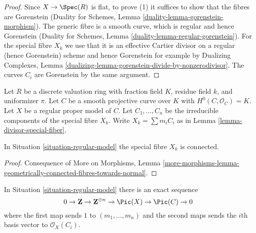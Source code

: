 \begin{proof}
Since $X \to \Spec(R)$ is flat, to prove (1)
it suffices to show that the fibres are Gorenstein
(Duality for Schemes, Lemma \ref{duality-lemma-gorenstein-morphism}).
The generic fibre is a smooth curve, which is regular and hence Gorenstein
(Duality for Schemes, Lemma \ref{duality-lemma-regular-gorenstein}).
For the special fibre $X_k$ we use that it is an effective
Cartier divisor on a regular (hence Gorenstein) scheme and hence
Gorenstein for example by Dualizing Complexes, Lemma
\ref{dualizing-lemma-gorenstein-divide-by-nonzerodivisor}.
The curves $C_i$ are Gorenstein by the same argument.
\end{proof}

\begin{situation}
\label{situation-regular-model}
Let $R$ be a discrete valuation ring with fraction field $K$,
residue field $k$, and uniformizer $\pi$.
Let $C$ be a smooth projective curve over $K$ with $H^0(C, \mathcal{O}_C) = K$.
Let $X$ be a regular proper model of $C$.
Let $C_1, \ldots, C_n$ be the irreducible components of the special
fibre $X_k$. Write $X_k = \sum m_i C_i$ as in
Lemma \ref{lemma-divisor-special-fiber}.
\end{situation}

\begin{lemma}
\label{lemma-regular-model-connected}
In Situation \ref{situation-regular-model} the special fibre $X_k$ is connected.
\end{lemma}

\begin{proof}
Consequence of More on Morphisms, Lemma
\ref{more-morphisms-lemma-geometrically-connected-fibres-towards-normal}.
\end{proof}

\begin{lemma}
\label{lemma-regular-model-pic}
In Situation \ref{situation-regular-model} there is an exact sequence
$$
0 \to \mathbf{Z} \to \mathbf{Z}^{\oplus n} \to
\Pic(X) \to \Pic(C) \to 0
$$
where the first map sends $1$ to $(m_1, \ldots, m_n)$ and the second
maps sends the $i$th basis vector to $\mathcal{O}_X(C_i)$.
\end{lemma}

